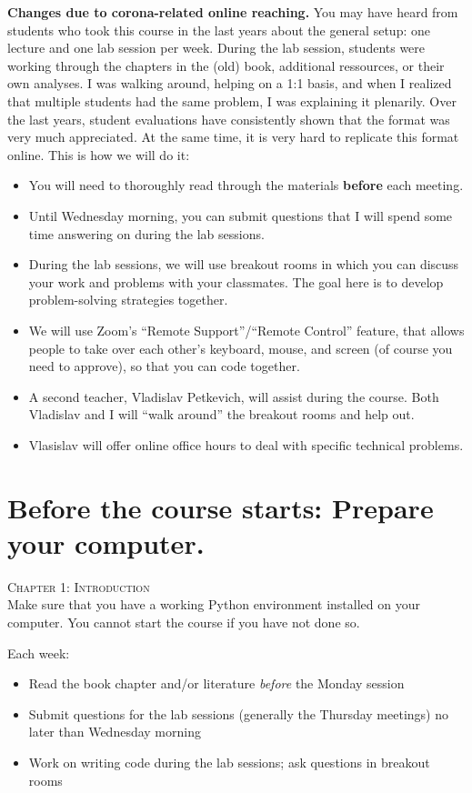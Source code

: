 \begin{corona}\noindent \textbf{Changes due to corona-related online reaching.} You may have heard from students who took this course in the last years about the general setup: one lecture and one lab session per week. During the lab session, students were working through the chapters in the (old) book,  additional ressources, or their own analyses. I was walking around, helping on a 1:1 basis, and when I realized that multiple students had the same problem, I was explaining it plenarily. Over the last years, student evaluations have consistently shown that the format was very much appreciated. At the same time, it is very hard to replicate this format online.
	This is how we will do it:

	\begin{itemize}
		\item You will need to thoroughly read through the materials \textbf{before} each meeting.
		\item Until Wednesday morning, you can submit questions that I will spend some time answering on during the lab sessions.
		\item During the lab sessions, we will use breakout rooms in which you can discuss your work and problems with your classmates. The goal here is to develop problem-solving strategies together.
		\item We will use Zoom's ``Remote Support''/``Remote Control'' feature, that allows people to take over each other's keyboard, mouse, and screen (of course you need to approve), so that you can code together.
		\item A second teacher, Vladislav Petkevich, will assist during the course. Both Vladislav and I will ``walk around'' the breakout rooms and help out.
		\item Vlasislav will offer online office hours to deal with specific technical problems.
	\end{itemize}
\end{corona}

\section*{Before the course starts: Prepare your computer.}
\textsc{ Chapter 1: Introduction}\\
Make sure that you have a working Python environment installed on your computer. You cannot start the course if you have not done so.

\begin{corona}
	Each week:
	\begin{itemize}
		\item Read the book chapter and/or literature \emph{before} the Monday session
		\item Submit questions for the lab sessions (generally the Thursday meetings) no later than Wednesday morning
		\item Work on writing code during the lab sessions; ask questions in breakout rooms
	\end{itemize}
\end{corona}

